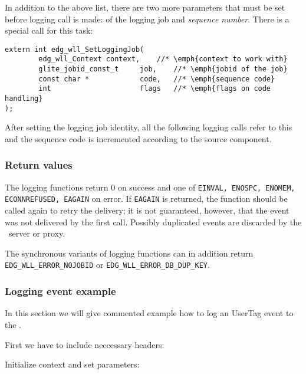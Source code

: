 %
In addition to the above list, there are two more parameters that must
be set before logging call is made: \jobid of the logging job and
\emph{sequence number}. There is a special call for this task:
\begin{lstlisting}
extern int edg_wll_SetLoggingJob(
        edg_wll_Context context,	//* \emph{context to work with}
        glite_jobid_const_t     job,	//* \emph{jobid of the job}
        const char *            code,	//* \emph{sequence code}
        int                     flags	//* \emph{flags on code handling}
);
\end{lstlisting}
After setting the logging job identity, all the following logging
calls refer to this \jobid and the sequence code is incremented
according to the source component.

\subsubsection{Return values}
The logging functions return 0 on success and one of \texttt{EINVAL,
ENOSPC, ENOMEM, ECONNREFUSED, EAGAIN} on error. If \texttt{EAGAIN} is
returned, the function should be called again to retry the delivery;
it is not guaranteed, however, that the event was not delivered by the
first call. Possibly duplicated events are discarded by the \LB\
server or proxy.

The synchronous variants of logging functions can in addition return
\verb'EDG_WLL_ERROR_NOJOBID' or \verb'EDG_WLL_ERROR_DB_DUP_KEY'.

\subsubsection{Logging event example}
In this section we will give commented example how to log an UserTag event to
the \LB.

First we have to include neccessary headers:


Initialize context and set parameters:




